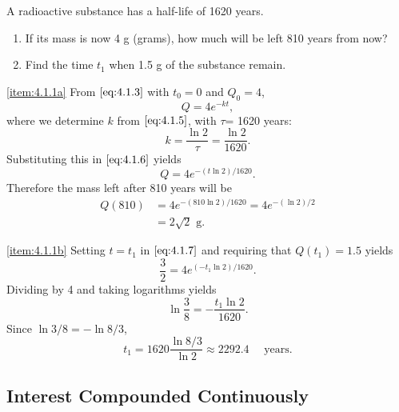 \documentclass{ximera}
\begin{document}
\begin{example}\label{example:4.1.1}
A  radioactive substance has a half-life of 1620 years.
\begin{enumerate}
\item \label{item:4.1.1a}%
If its mass is now 4 g (grams), how much will be left 810 years
from now?
\item \label{item:4.1.1b}%
Find the time $t_1$ when 1.5 g of the substance remain.
\end{enumerate}
\begin{explanation}

\ref{item:4.1.1a}
From $\eqref{eq:4.1.3}$ with $t_0=0$ and
$Q_0=4$,
\begin{equation} \label{eq:4.1.6}
Q=4e^{-kt},
\end{equation}
 where we determine $k$ from $\eqref{eq:4.1.5}$, with $\tau$=
1620 years:
$$
k=\frac{\ln2}{\tau}=\frac{\ln2}{1620}.
$$
 Substituting this in $\eqref{eq:4.1.6}$ yields
\begin{equation} \label{eq:4.1.7}
Q=4e^{-(t\ln2)/1620}.
\end{equation}
 Therefore the mass left after 810 years will be
$$\begin{array}{rl}
Q(810) &=4e^{-(810\ln2)/1620}=4e^{-(\ln2)/2} \\
&=2\sqrt{2} \mbox{ g}.
\end{array}$$

\ref{item:4.1.1b}
 Setting $t=t_1$  in $\eqref{eq:4.1.7}$ and requiring that
$Q(t_1)=1.5$ yields
$$
\frac{3}{2}=4e^{(-t_1\ln2)/1620}.
$$
Dividing by 4 and taking logarithms yields
$$
\ln\frac{3}{8}=-\frac{t_1\ln2}{1620}.
$$
Since $\ln3/8=-\ln8/3$,
$$
t_1=1620\frac{\ln8/3}{\ln2}\approx  2292.4\quad\mbox{ years}.
$$
\end{explanation}
\end{example}

\subsection*{Interest Compounded Continuously}
\end{document}
